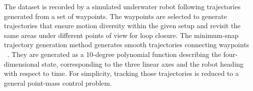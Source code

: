 The dataset is recorded by a simulated underwater robot following trajectories generated from a set of waypoints. The waypoints are selected to generate trajectories that ensure motion diversity within the given setup and revisit the same areas under different points of view for loop closure.
The minimum-snap trajectory generation method generates smooth trajectories connecting waypoints ~\cite{richter2016polynomial}. They are generated as a 10-degree polynomial function describing the four-dimensional state, corresponding to the three linear axes and the robot heading with respect to time. For simplicity, tracking those trajectories is reduced to a general point-mass control problem.





